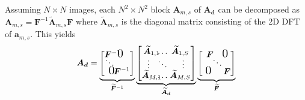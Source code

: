 \documentclass{article}
\begin{document}
Assuming $N \times N$ images, each $N^2 \times N^2$ block $\bm A_{m,s}$ of $\bm
{A_d}$ can be decomposed as $\bm A_{m,s} = \bm F^{-1} \widetilde{\bm A}_{m,s}
\bm F$ where $\widetilde{\bm A}_{m,s}$ is the diagonal matrix consisting of the
2D DFT of $\bm a_{m,s}$. This yields
\vspace{-0.1 in}
\begin{equation}
  \bm {A_d}=
  \underbrace{
    \begin{bmatrix}
      \bm F^{-1} \hspace{-0.2 in}& \hspace{-0.2 in} & \hspace{-0.20 in} \vspace{-0.1 in}\text{\Large 0} \\
        \vspace{-0.05 in}&\hspace{-0.20 in} \ddots &  \\
      \text{\Large 0} \hspace{-0.17 in}& \hspace{-0.2 in} & \hspace{-0.15 in} \bm F^{-1}
    \end{bmatrix}
  }_{\widetilde{\bm F}^{-1}}
  \underbrace{
    \begin{bmatrix}
      \widetilde{\bm A}_{1,1} \hspace{-0.1 in}&\hspace{-0.1 in} \hdots & \hspace{-0.1 in} \widetilde{\bm A}_{1,S} \vspace{-0.02 in}\\
      \vspace{-0.02 in}\vdots &\hspace{-0.1 in} \ddots& \vdots \\
      \widetilde{\bm A}_{M,1} \hspace{-0.1 in}&\hspace{-0.1 in} \hdots & \hspace{-0.1 in} \widetilde{\bm A}_{M,S} \\
    \end{bmatrix}
  }_{\widetilde{\bm A}_{\bm d}}
  \underbrace{
    \begin{bmatrix}
      \bm F \hspace{-0.1 in}& & \hspace{-0.18 in} \vspace{-0.1 in}\text{\Large 0} \\
        \vspace{-0.05 in}& \hspace{-0.12 in}\ddots &  \\
  \hspace{0.05 in} \text{\Large 0} & & \hspace{-0.12 in} \bm F
    \end{bmatrix}
  }_{\widetilde{\bm F}}
\label{eq:fourier_mtx}
\end{equation}
\vspace{-0.1 in}
\end{document}
